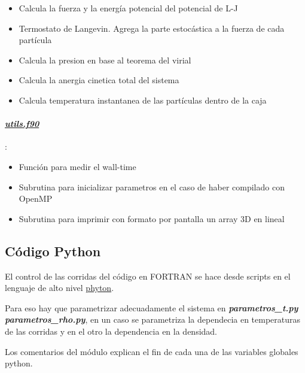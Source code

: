 \begin{itemize}
	\item Calcula la fuerza y la energía potencial del potencial de L-J

	\item Termostato de Langevin. Agrega la parte estocástica a la fuerza de cada partícula

	\item Calcula la presion en base al teorema del virial 

	\item Calcula la anergia cinetica total del sistema

	\item Calcula temperatura instantanea de las partículas dentro de la caja 
\end{itemize}


\paragraph{\underline{\textit{utils.f90}}}:

\begin{itemize}
   \item Función para medir el wall-time

 \item   Subrutina para inicializar parametros en el caso de haber compilado con OpenMP

 \item   Subrutina para imprimir con formato por pantalla un array 3D en lineal 

\end{itemize}



\subsection{Código Python}

El control de las corridas del código en FORTRAN se hace desde scripts en el lenguaje
de alto nivel  \href{http://www.python.org/}{phyton}. 

Para eso hay que parametrizar adecuadamente el sistema en \textbf{\textit{parametros\_t.py}}
\textbf{\textit{parametros\_rho.py}}, en un caso se parametriza la dependecia en temperaturas
de las corridas y en el otro la dependencia en la densidad.
 
Los comentarios del módulo explican el fin de cada una de las variables globales python.

